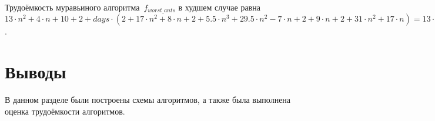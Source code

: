 Трудоёмкость муравьиного алгоритма~$f_{worst\_ants}$ в худшем случае равна $13 \cdot n^2 + 4 \cdot n + 10 + 2 + days \cdot (2 + 17 \cdot n ^ 2 + 8 \cdot n + 2 + 5.5 \cdot n^3 + 29.5 \cdot n^2 - 7 \cdot n + 2 + 9 \cdot n + 2 + 31 \cdot n^2 + 17 \cdot n) = 13 \cdot n^2 + 4 \cdot n + 12 + days \cdot (5.5 \cdot n^3 + 77.5 \cdot n^2 + 2 \cdot n + 8)$.

\section*{Выводы}

В данном разделе были построены схемы алгоритмов, а также была выполнена оценка трудоёмкости алгоритмов.


